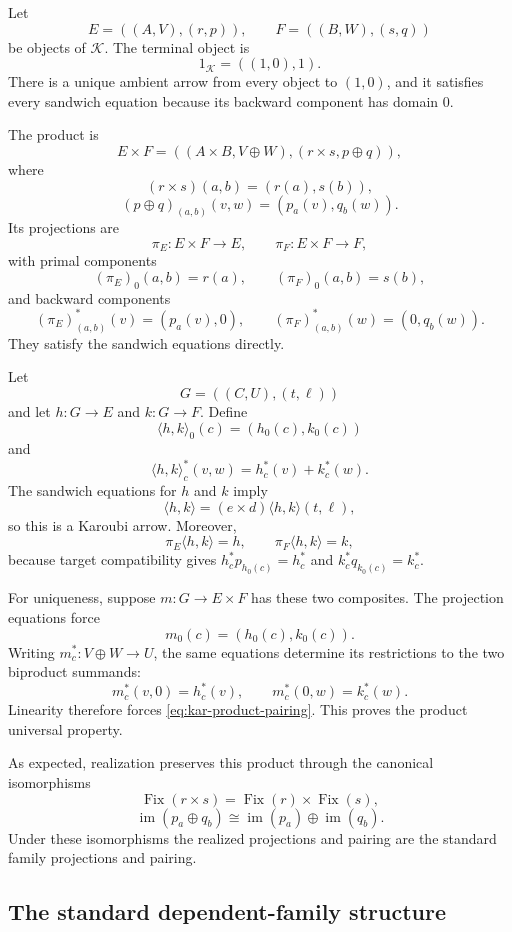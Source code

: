 \documentclass[runningheads,envcountsame]{llncs}
\newcommand{\Fix}{\operatorname{Fix}}
\newcommand{\im}{\operatorname{im}}
\begin{document}
Let
$$
E=((A,V),(r,p)),
\qquad
F=((B,W),(s,q))
$$
be objects of $\mathcal K$.
The terminal object is
$$
1_{\mathcal K}=((1,0),1).
$$
There is a unique ambient arrow from every object to $(1,0)$, and it
satisfies every sandwich equation because its backward component has domain
$0$.

The product is
\begin{equation}
E\times F
=
\left(
(A\times B,V\oplus W),
(r\times s,p\oplus q)
\right),
\label{eq:kar-product}
\end{equation}
where
$$
(r\times s)(a,b)=(r(a),s(b)),
$$
$$
(p\oplus q)_{(a,b)}(v,w)=(p_a(v),q_b(w)).
$$
Its projections are
$$
\pi_E:E\times F\longrightarrow E,
\qquad
\pi_F:E\times F\longrightarrow F,
$$
with primal components
$$
(\pi_E)_0(a,b)=r(a),
\qquad
(\pi_F)_0(a,b)=s(b),
$$
and backward components
$$
(\pi_E)^*_{(a,b)}(v)=(p_a(v),0),
\qquad
(\pi_F)^*_{(a,b)}(w)=(0,q_b(w)).
$$
They satisfy the sandwich equations directly.

Let
$$
G=((C,U),(t,\ell))
$$
and let $h:G\to E$ and $k:G\to F$. Define
$$
\langle h,k\rangle_0(c)=(h_0(c),k_0(c))
$$
and
\begin{equation}
\langle h,k\rangle_c^*(v,w)
=h_c^*(v)+k_c^*(w).
\label{eq:kar-product-pairing}
\end{equation}
The sandwich equations for $h$ and $k$ imply
$$
\langle h,k\rangle
=(e\times d)\langle h,k\rangle(t,\ell),
$$
so this is a Karoubi arrow. Moreover,
$$
\pi_E\langle h,k\rangle=h,
\qquad
\pi_F\langle h,k\rangle=k,
$$
because target compatibility gives $h_c^*p_{h_0(c)}=h_c^*$ and
$k_c^*q_{k_0(c)}=k_c^*$.

For uniqueness, suppose $m:G\to E\times F$ has these two composites. The
projection equations force
$$
m_0(c)=(h_0(c),k_0(c)).
$$
Writing $m_c^*:V\oplus W\to U$, the same equations determine its restrictions
to the two biproduct summands:
$$
m_c^*(v,0)=h_c^*(v),
\qquad
m_c^*(0,w)=k_c^*(w).
$$
Linearity therefore forces \eqref{eq:kar-product-pairing}. This proves the
product universal property.

As expected, realization preserves this product through the canonical isomorphisms
$$
\Fix(r\times s)=\Fix(r)\times\Fix(s),
$$
$$
\im(p_a\oplus q_b)
\cong
\im(p_a)\oplus\im(q_b).
$$
Under these isomorphisms the realized projections and pairing are the
standard family projections and pairing.

\subsection{The standard dependent-family structure}
\end{document}
